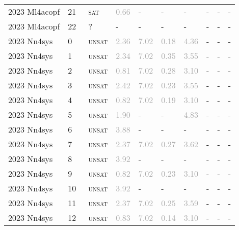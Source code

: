 \begin{center}
{\begin{longtable}{@{}llllllllll@{}}
2023 Ml4acopf & 21 & ~\textsc{sat} & \textcolor{darkgray}{0.66} & - & - & - & - & - & - \\
2023 Ml4acopf & 22 & ~? & - & - & - & - & - & - & - \\
\midrule
2023 Nn4sys & 0 & ~\textsc{unsat} & \textcolor{darkgray}{2.36} & \textcolor{darkgray}{7.02} & \textcolor{darkgray}{0.18} & \textcolor{darkgray}{4.36} & - & - & - \\
2023 Nn4sys & 1 & ~\textsc{unsat} & \textcolor{darkgray}{2.34} & \textcolor{darkgray}{7.02} & \textcolor{darkgray}{0.35} & \textcolor{darkgray}{3.55} & - & - & - \\
2023 Nn4sys & 2 & ~\textsc{unsat} & \textcolor{darkgray}{0.81} & \textcolor{darkgray}{7.02} & \textcolor{darkgray}{0.28} & \textcolor{darkgray}{3.10} & - & - & - \\
2023 Nn4sys & 3 & ~\textsc{unsat} & \textcolor{darkgray}{2.42} & \textcolor{darkgray}{7.02} & \textcolor{darkgray}{0.23} & \textcolor{darkgray}{3.55} & - & - & - \\
2023 Nn4sys & 4 & ~\textsc{unsat} & \textcolor{darkgray}{0.82} & \textcolor{darkgray}{7.02} & \textcolor{darkgray}{0.19} & \textcolor{darkgray}{3.10} & - & - & - \\
2023 Nn4sys & 5 & ~\textsc{unsat} & \textcolor{darkgray}{1.90} & - & - & \textcolor{darkgray}{4.83} & - & - & - \\
2023 Nn4sys & 6 & ~\textsc{unsat} & \textcolor{darkgray}{3.88} & - & - & - & - & - & - \\
2023 Nn4sys & 7 & ~\textsc{unsat} & \textcolor{darkgray}{2.37} & \textcolor{darkgray}{7.02} & \textcolor{darkgray}{0.27} & \textcolor{darkgray}{3.62} & - & - & - \\
2023 Nn4sys & 8 & ~\textsc{unsat} & \textcolor{darkgray}{3.92} & - & - & - & - & - & - \\
2023 Nn4sys & 9 & ~\textsc{unsat} & \textcolor{darkgray}{0.82} & \textcolor{darkgray}{7.02} & \textcolor{darkgray}{0.23} & \textcolor{darkgray}{3.10} & - & - & - \\
2023 Nn4sys & 10 & ~\textsc{unsat} & \textcolor{darkgray}{3.92} & - & - & - & - & - & - \\
2023 Nn4sys & 11 & ~\textsc{unsat} & \textcolor{darkgray}{2.37} & \textcolor{darkgray}{7.02} & \textcolor{darkgray}{0.25} & \textcolor{darkgray}{3.59} & - & - & - \\
2023 Nn4sys & 12 & ~\textsc{unsat} & \textcolor{darkgray}{0.83} & \textcolor{darkgray}{7.02} & \textcolor{darkgray}{0.14} & \textcolor{darkgray}{3.10} & - & - & - \\

\end{longtable}}
\end{center}

